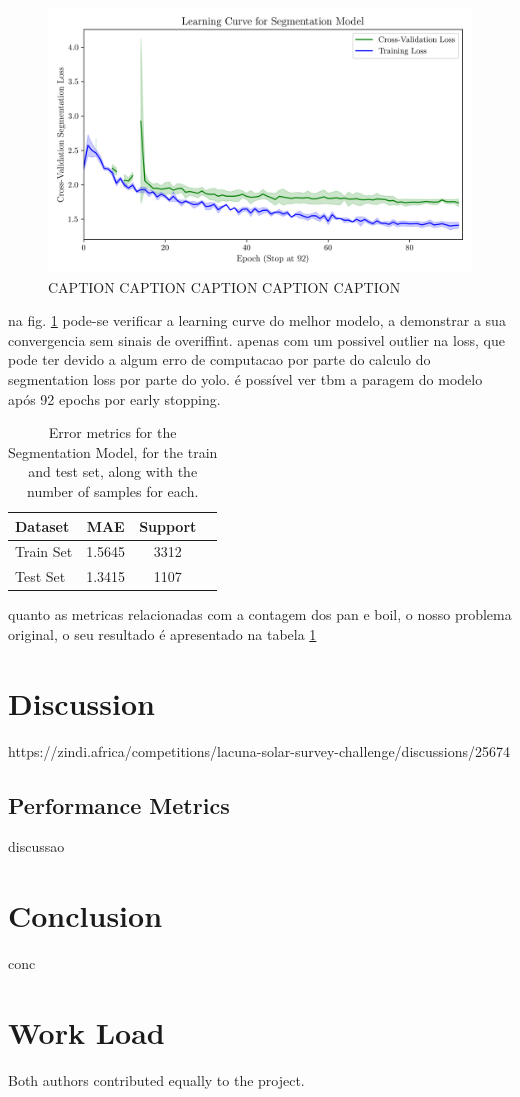 \documentclass[conference]{IEEEtran}
\begin{document}
\begin{figure}[H]
    \centering
    \includegraphics[width=1\linewidth]{assets/model02_lc.png}
    \caption{CAPTION CAPTION CAPTION CAPTION CAPTION}
    \label{fig:model02_lc}
\end{figure}

na fig. \ref{fig:model02_lc} pode-se verificar a learning curve do melhor modelo, a demonstrar a sua convergencia sem sinais de overiffint. apenas com um possivel outlier na loss, que pode ter devido a algum erro de computacao por parte do calculo do segmentation loss por parte do yolo. é possível ver tbm a paragem do modelo após 92 epochs por early stopping.

\begin{table}[H]
\centering
\caption{Error metrics for the Segmentation Model, for the train and test set, along with the number of samples for each.}
\label{tab:model02_results}
\begin{tabular}{lccc}
\toprule
\textbf{Dataset} & \textbf{MAE} & \textbf{Support} \\
\midrule
Train Set & 1.5645 & 3312 \\
Test Set & 1.3415 & 1107 \\
\bottomrule
\end{tabular}
\end{table}

quanto as metricas relacionadas com a contagem dos pan e boil, o nosso problema original, o seu resultado é apresentado na tabela \ref{tab:model02_results}


\section{Discussion} 

https://zindi.africa/competitions/lacuna-solar-survey-challenge/discussions/25674

\subsection{Performance Metrics}

discussao


\section{Conclusion}

conc


\section*{Work Load}

Both authors contributed equally to the project.



\end{document}
